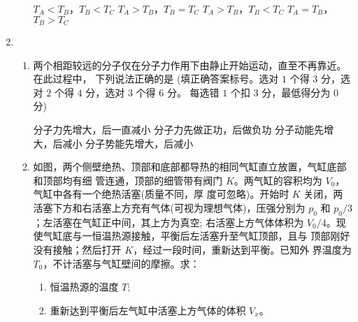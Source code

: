 \begin{enumerate}
\begin{enumerate}
\fourchoices
{$ T_{A} < T_{B} $，$ T_{B} < T_{C} $}
{$ T_{A} > T_{B} $，$ T_{B} = T_{C} $}
{$ T_{A} > T_{B} $，$ T_{B} < T_{C} $}
{$ T_{A} = T_{B} $，$ T_{B} > T_{C} $}



\end{enumerate}



\item 
{}
\begin{enumerate}
	\item
两个相距较远的分子仅在分子力作用下由静止开始运动，直至不再靠近。在此过程中，
下列说法正确的是 \underlinegap 
(填正确答案标号。选对 $ 1 $ 个得 $ 3 $ 分，选对 $ 2 $ 个得 $ 4 $ 分，选对 $ 3 $ 个得 $ 6 $ 分。
每选错 $ 1 $ 个扣 $ 3 $ 分，最低得分为 $ 0 $ 分)

\fourchoices
{分子力先增大，后一直减小}
{分子力先做正功，后做负功}
{分子动能先增大，后减小}
{分子势能先增大，后减小}


\item 
如图，两个侧壁绝热、顶部和底部都导热的相同气缸直立放置，气缸底部和顶部均有细
管连通，顶部的细管带有阀门 $ K $。两气缸的容积均为 $ V_{0} $，气缸中各有一个绝热活塞(质量不同，厚
度可忽略)。开始时 $ K $ 关闭，两活塞下方和右活塞上方充有气体(可视为理想气体)，压强分别为 $ p_{0} $
和 $ p_{0} /3 $；左活塞在气缸正中间，其上方为真空; 右活塞上方气体体积为
$ V_{0}/4 $。现使气缸底与一恒温热源接触，平衡后左活塞升至气缸顶部，且与
顶部刚好没有接触；然后打开 $ K $，经过一段时间，重新达到平衡。已知外
界温度为 $ T_{0} $，不计活塞与气缸壁间的摩擦。求：
\begin{enumerate}
	\item
恒温热源的温度 $ T $;
\item 
重新达到平衡后左气缸中活塞上方气体的体积 $ V_{x} $。

	
\end{enumerate}
\begin{figure}[h!]
	\flushright
	
\end{figure}


\end{enumerate}
\end{enumerate}
